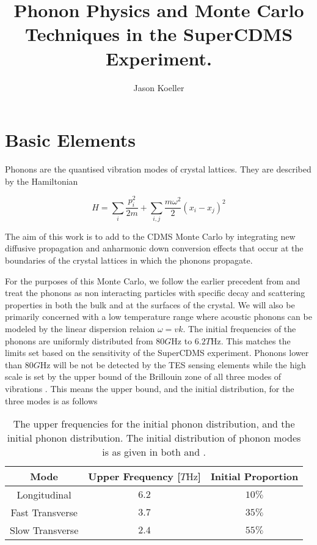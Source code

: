 \documentclass[11pt]{article}
\begin{document}
\title{Phonon Physics and Monte Carlo Techniques in the SuperCDMS Experiment.}
\author{Jason Koeller}
\date{}
\maketitle

\section*{Basic Elements}
Phonons are the quantised vibration modes of crystal lattices. They are described by the Hamiltonian \cite{1}

\begin{equation}
H = \sum_i \frac{p_i^2}{2m} + \sum_{i,j} \frac{m\omega^2}{2}(x_i - x_j)^2
\end{equation}

The aim of this work is to add to the CDMS Monte Carlo by integrating new diffusive propagation and anharmonic
down conversion effects that occur at the boundaries of the crystal lattices in which the phonons propagate. 

For the purposes of this Monte Carlo, we follow the earlier precedent from \cite{1} and treat the phonons as non
interacting particles with specific decay and scattering properties in both the bulk and at the surfaces of the crystal. We
will also be primarily concerned with a low temperature range where acoustic phonons can be modeled by the linear 
dispersion relaion $\omega = vk$. The initial frequencies of the phonons are uniformly distributed from $80 \si{G\hertz}$ to $6.2 \si{T\hertz}$.
This matches the limits set based on the sensitivity of the SuperCDMS experiment. Phonons lower than $80\si{G\hertz}$ will
be not be detected by the TES sensing elements while the high scale is set by the upper bound of the Brillouin zone of
all three modes of vibrations \cite{2}. This means the upper bound, and the initial distribution, for the three modes is  as follows
\begin{table}[!h]
\begin{center}
\begin{tabular}{|c|c|c|} \hline
Mode & Upper Frequency [$\si{T\hertz}$] & Initial Proportion \\  \hline
Longitudinal & $6.2$ & $10\%$ \\ \hline
Fast Transverse & $3.7$ & $35\%$ \\ \hline
Slow Transverse & $2.4$ & $55\%$\\ \hline
\end{tabular}
\end{center}
\caption{The upper frequencies for the initial phonon distribution, and the initial phonon distribution. The initial distribution of phonon modes is as given in both \cite{1} and \cite{2}.}
\end{table}
\end{document}
